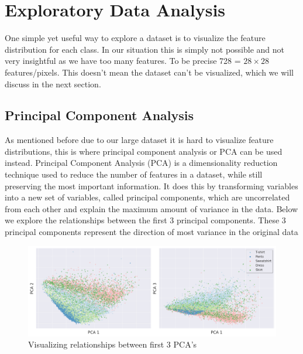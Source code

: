 \section{Exploratory Data Analysis}

One simple yet useful way to explore a dataset is to visualize the feature distribution for each class.
In our situation this is simply not possible and not very insightful as we have too many features.
To be precise 728 = $28\times28$ features/pixels.
This doesn't mean the dataset can't be visualized, which we will discuss in the next section.

\subsection{Principal Component Analysis}\label{subsec:principal-component-analysis}
As mentioned before due to our large dataset it is hard to visualize feature distributions, this is where principal component analysis or PCA can be used instead.
Principal Component Analysis (PCA) is a dimensionality reduction technique used to reduce the number of features in a dataset, while still preserving the most important information.
It does this by transforming variables into a new set of variables, called principal components, which are uncorrelated from each other and explain the maximum amount of variance in the data.
Below we explore the relationships between the first 3 principal components.
These 3 principal components represent the direction of most variance in the original data\\
\begin{figure}[ht]
    \centering
    \includegraphics[scale=0.32]{figures_for_report/PCA}
    \captionsetup{justification=centering,margin=2cm}
    \caption{Visualizing relationships between first 3 PCA's}\label{fig:figure}
\end{figure}

